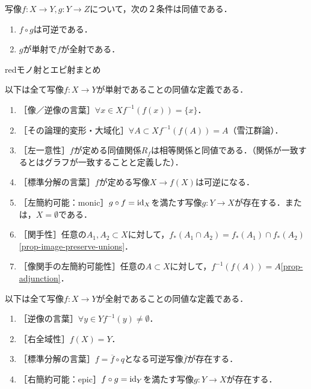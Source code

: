 \documentclass[uplatex,dvipdfmx]{jsreport}
\begin{document}
\begin{proposition}
    写像$f:X\to Y,g:Y\to Z$について，次の２条件は同値である．
    \begin{enumerate}
        \item $f\circ g$は可逆である．
        \item $g$が単射で$f$が全射である．
    \end{enumerate}
\end{proposition}

\begin{tbox}{red}{モノ射とエピ射まとめ}
    \begin{theorem}[mono]\label{thm-mono}
        以下は全て写像$f:X\to Y$が単射であることの同値な定義である．
        \begin{enumerate}
            \item ［像／逆像の言葉］$\forall x\in X f^{-1}(f(x))=\{x\}$．
            \item ［その論理的変形・大域化］$\forall A\subset X f^{-1}(f(A))=A$（雪江群論）．
            \item ［左一意性］$f$が定める同値関係$R_f$は相等関係と同値である．（関係が一致するとはグラフが一致することと定義した）．
            \item ［標準分解の言葉］$f$が定める写像$X\to f(X)$は可逆になる．
            \item ［左簡約可能：monic］$g\circ f=\mathrm{id}_X$を満たす写像$g:Y\to X$が存在する．または，$X=\emptyset$である．
            \item ［関手性］任意の$A_1,A_2\subset X$に対して，$f_*(A_1\cap A_2)=f_*(A_1)\cap f_*(A_2)$\ref{prop-image-preserve-unions}．
            \item ［像関手の左簡約可能性］任意の${A\subset X}$に対して，$f^{-1}(f(A))=A$\ref{prop-adjunction}．
        \end{enumerate}
    \end{theorem}
    \begin{theorem}[epi (AC)]\label{thm-epi}
        以下は全て写像$f:X\to Y$が全射であることの同値な定義である．
        \begin{enumerate}
            \item ［逆像の言葉］$\forall y\in Y f^{-1}(y)\ne\emptyset$．
            \item ［右全域性］$f(X)=Y$．
            \item ［標準分解の言葉］$f=\overline{f}\circ q$となる可逆写像$\overline{f}$が存在する．
            \item ［右簡約可能：epic］$f\circ g=\mathrm{id}_Y$を満たす写像$g:Y\to X$が存在する．
        \end{enumerate}
    \end{theorem}
\end{tbox}
\end{document}
